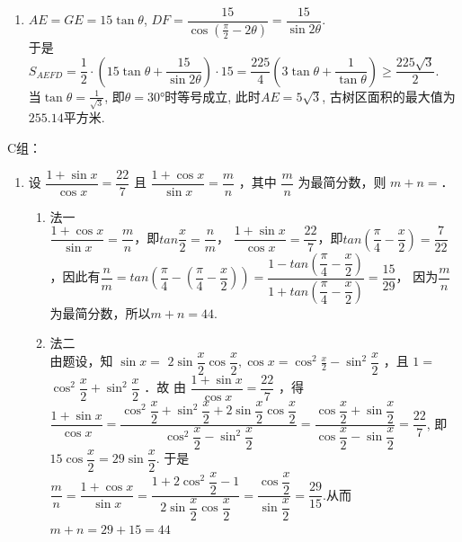 \begin{enumerate}
\begin{jieda}
\begin{enumerate}
\item $AE=GE=15\tan\theta$, $DF=\dfrac{15}{\cos(\frac{\pi}{2}-2\theta)}=\dfrac{15}{\sin2\theta}$. \\
于是$S_{AEFD}=\dfrac{1}{2}\cdot\left(15\tan\theta+\dfrac{15}{\sin2\theta}\right)\cdot15
=\dfrac{225}{4}\left(3\tan\theta+\dfrac{1}{\tan\theta}\right)\geq\dfrac{225\sqrt{3}}{2}$. \\
当$\tan\theta=\frac{1}{\sqrt{3}}$, 即$\theta=\ang{30}$时等号成立, 此时$AE=5\sqrt{3}$, 古树区面积的最大值为$255.14$平方米. 
\end{enumerate}
\end{jieda}

\end{enumerate}

C组：
\begin{enumerate}
\item 设 $\dfrac{1+\sin x}{\cos x}=\dfrac{22}{7}$ 且 $\dfrac{1+\cos x}{\sin x}=\dfrac{m}{n}$ ，其中 $\dfrac{m}{n}$ 为最简分数，则 $m+n=$．

\begin{jieda}
    \begin{enumerate}
        \item 法一 \\
            $\dfrac{1+\cos x}{\sin x}=\dfrac{m}{n}$，即$tan\dfrac{x}{2} = \dfrac{n}{m}$，
            $\dfrac{1+\sin x}{\cos x}=\dfrac{22}{7}$，即$tan(\dfrac{\pi}{4} - \dfrac{x}{2}) = \dfrac{7}{22}$，因此有$\dfrac{n}{m} = tan(\dfrac{\pi}{4} - (\dfrac{\pi}{4} - \dfrac{x}{2})) = \dfrac{1-tan(\dfrac{\pi}{4} - \dfrac{x}{2})}{1+tan(\dfrac{\pi}{4}-\dfrac{x}{2})} = \dfrac{15}{29}$， 因为$\dfrac{m}{n}$ 为最简分数，所以$m+n=44$.
        \item 法二 \\
            由题设，知 $\sin x=$ $2 \sin \dfrac{x}{2} \cos \dfrac{x}{2}, \cos x=\cos ^2 \frac{x}{2}-\sin ^2 \dfrac{x}{2}$ ，且 $1=$ $\cos ^2 \dfrac{x}{2}+\sin ^2 \dfrac{x}{2}$ ．故 由 $\dfrac{1+\sin x}{\cos x}=\dfrac{22}{7}$ ，得 $\dfrac{1+\sin x}{\cos x}=\dfrac{\cos ^2 \dfrac{x}{2}+\sin ^2 \dfrac{x}{2}+2 \sin \dfrac{x}{2} \cos \dfrac{x}{2}}{\cos ^2 \dfrac{x}{2}-\sin ^2 \dfrac{x}{2}}=\dfrac{\cos\dfrac{x}{2}+\sin\dfrac{x}{2}}{\cos\dfrac{x}{2}-\sin\dfrac{x}{2}}=\dfrac{22}{7}$, 即$15\cos\dfrac{x}{2}=29\sin\dfrac{x}{2}$. 于是$\dfrac{m}{n}=\dfrac{1+\cos x}{\sin x}=\dfrac{1+2\cos ^2\dfrac{x}{2}-1}{2\sin\dfrac{x}{2}\cos\dfrac{x}{2}}=\dfrac{\cos \dfrac{x}{2}}{\sin\dfrac{x}{2}}=\dfrac{29}{15}$.从而$m+n=29+15=44$
    \end{enumerate}


\end{jieda}
\end{enumerate}
